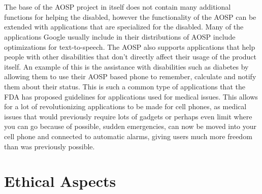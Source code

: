 \documentclass[conference]{IEEEtran}
\begin{document}
\\\\The base of the AOSP project in itself does not contain many additional functions for helping the disabled, however the functionality of the AOSP can be extended with applications that are specialized for the disabled.\cite{Android-disabled-applications} Many of the applications Google usually include in their distributions of AOSP include optimizations for text-to-speech.\cite{Android-disabled-help} The AOSP also supports applications that help people with other disabilities that don't directly affect their usage of the product itself. An example of this is the assistance with disabilities such as diabetes by allowing them to use their AOSP based phone to remember, calculate and notify them about their status.\cite{Android-disabled-diabetes} This is such a common type of applications that the FDA has proposed guidelines for applications used for medical issues.\cite{Android-disabled-FDA} This allows for a lot of revolutionizing applications to be made for cell phones, as medical issues that would previously require lots of gadgets or perhaps even limit where you can go because of possible, sudden emergencies, can now be moved into your cell phone and connected to automatic alarms, giving users much more freedom than was previously possible. 



\section{Ethical Aspects}
\label{ethics}
\end{document}
